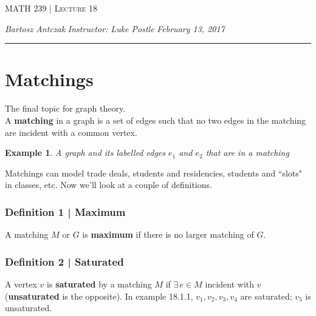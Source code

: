 \documentclass{report}
\newcommand{\lectureNum}{18}
\newcommand{\curDate}{February 13, 2017}
\newcommand{\course}{MATH 239}
\newcommand{\instructor}{Luke Postle}
\newtheorem{ex}{Example}[section]
\begin{document}
\begin{center}
\begin{Large}
\textsc{\course{} | Lecture \lectureNum{}}
\end{Large}
\end{center} 
\noindent \textit{Bartosz Antczak} \hfill
\textit{Instructor: \instructor{}} \hfill
\textit{\curDate{}}
\rule{\textwidth}{0.4pt}
\section{Matchings}
The final topic for graph theory.\\
A \textbf{matching} in a graph is a set of edges such that no two edges in the matching are incident with a common vertex.
\begin{ex}
A graph and its labelled edges $e_1$ and $e_2$ that are in a matching
\end{ex}
\begin{center}
\end{center}
Matchings can model trade deals, students and residencies, students and ``slots" in classes, etc. Now we'll look at a couple of definitions.
\subsubsection{Definition 1 | Maximum}
A matching $M$ or $G$ is \textbf{maximum} if there is no larger matching of $G$.
\subsubsection{Definition 2 | Saturated}
A vertex $v$ is \textbf{saturated} by a matching $M$ if $\exists \, e \in M$ incident with $v$ (\textbf{unsaturated} is the opposite). In example 18.1.1, $v_1, v_2, v_3, v_4$ are saturated; $v_5$ is unsaturated.
\end{document}
